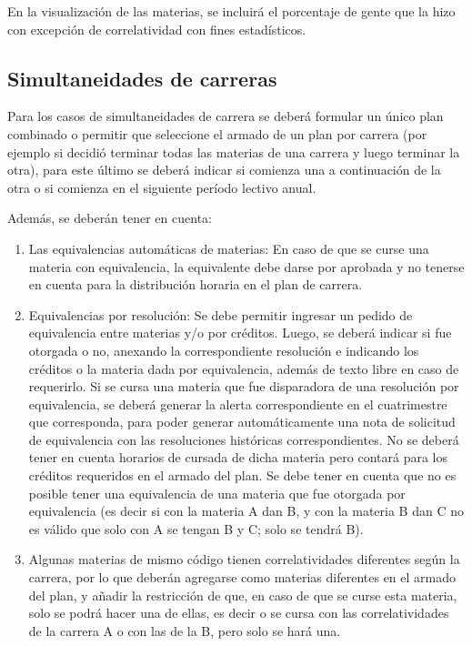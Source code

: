 \documentclass[a4paper]{article}
\begin{document}
En la visualización de las materias, se incluirá el porcentaje de gente que la hizo con excepción de correlatividad con fines estadísticos.

\subsection{Simultaneidades de carreras}

Para los casos de simultaneidades de carrera se deberá formular un único plan combinado o permitir que seleccione el armado de un plan por carrera (por ejemplo si decidió terminar todas las materias de una carrera y luego terminar la otra), para este último se deberá indicar si comienza una a continuación de la otra o si comienza en el siguiente período lectivo anual.

Además, se deberán tener en cuenta: 

\begin{enumerate}
	\item Las equivalencias automáticas de materias: En caso de que se curse una materia con equivalencia, la equivalente debe darse por aprobada y no tenerse en cuenta para la distribución horaria en el plan de carrera.
	
	\item Equivalencias por resolución: Se debe permitir ingresar un pedido de equivalencia entre materias y/o por créditos. Luego, se deberá indicar si fue otorgada o no, anexando la correspondiente resolución e indicando los créditos o la materia dada por equivalencia, además de texto libre en caso de requerirlo.
	Si se cursa una materia que fue disparadora de una resolución por equivalencia, se deberá generar la alerta correspondiente en el cuatrimestre que corresponda, para poder generar automáticamente una nota de solicitud de equivalencia con las resoluciones históricas correspondientes. No se deberá tener en cuenta horarios de cursada de dicha materia pero contará para los créditos requeridos en el armado del plan.
	Se debe tener en cuenta que no es posible tener una equivalencia de una materia que fue otorgada por equivalencia (es decir si con la materia A dan B, y con la materia B dan C no es válido que solo con A se tengan B y C; solo se tendrá B).
	
	\item Algunas materias de mismo código tienen correlatividades diferentes según la carrera, por lo que deberán agregarse como materias diferentes en el armado del plan, y añadir la restricción de que, en caso de que se curse esta materia, solo se podrá hacer una de ellas, es decir o se cursa con las correlatividades de la carrera A o con las de la B, pero solo se hará una.
\end{enumerate}
\end{document}
